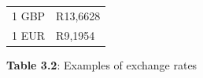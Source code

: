 {{\begin{center}
\begin{tabular}[t]{|l|l|}
    
        1 GBP &
    
    
        R13,6628%
     \tabularnewline\cline{1-1}\cline{2-2}
    
    
        1 EUR &
    
    
        R9,1954%
     \tabularnewline\cline{1-1}\cline{2-2}
    \end{tabular}
      \end{center}
    \begin{center}{\small\bfseries Table 3.2}: Examples of exchange rates\end{center}
    
    \addtocounter{footnote}{-0}
    
          }{ %
        
    
        \begin{center}
      
      \label{m39335*uid4}
      
    \noindent
      \tablelasttail{}
      \begin{xtabular}[t]{|l|l|}\hline
    

\end{xtabular}
\end{center}}}
